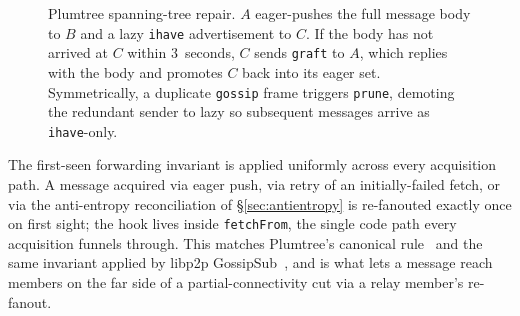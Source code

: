 \documentclass[11pt,a4paper,twocolumn]{article}
\begin{document}
\begin{figure}[t]
\centering
{}
\caption{Plumtree spanning-tree repair. $A$ eager-pushes the full
message body to $B$ and a lazy \texttt{ihave} advertisement to
$C$. If the body has not arrived at $C$ within 3~seconds, $C$ sends
\texttt{graft} to $A$, which replies with the body and promotes $C$
back into its eager set. Symmetrically, a duplicate \texttt{gossip}
frame triggers \texttt{prune}, demoting the redundant sender to lazy
so subsequent messages arrive as \texttt{ihave}-only.}
\label{fig:plumtree}
\end{figure}

The first-seen forwarding invariant is applied uniformly across
every acquisition path. A message acquired via eager push, via
retry of an initially-failed fetch, or via the anti-entropy
reconciliation of \S\ref{sec:antientropy} is re-fanouted exactly
once on first sight; the hook lives inside \texttt{fetchFrom}, the
single code path every acquisition funnels through. This matches
Plumtree's canonical rule~\citep{leitao2007plumtree} and the same
invariant applied by libp2p
GossipSub~\citep{vyzovitis2020gossipsub}, and is what lets a
message reach members on the far side of a partial-connectivity
cut via a relay member's re-fanout.
\end{document}
